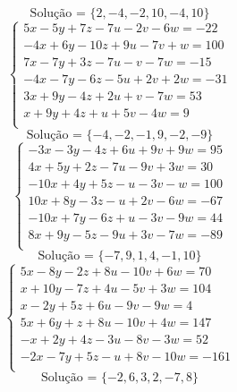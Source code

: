 \documentclass[12pt,oneside,a4paper]{article}
\begin{document}
\begin{equation*}
\text{Solução = }\{2,-4,-2,10,-4,10\}
\end{equation*}
\vspace{\baselineskip}
\begin{equation*}
\begin{cases}
5x-5y+7z-7u-2v-6w=-22 \\
-4x+6y-10z+9u-7v+w=100 \\
7x-7y+3z-7u-v-7w=-15 \\
-4x-7y-6z-5u+2v+2w=-31 \\
3x+9y-4z+2u+v-7w=53 \\
x+9y+4z+u+5v-4w=9 \\
\end{cases}
\end{equation*}
\begin{equation*}
\text{Solução = }\{-4,-2,-1,9,-2,-9\}
\end{equation*}
\vspace{\baselineskip}
\begin{equation*}
\begin{cases}
-3x-3y-4z+6u+9v+9w=95 \\
4x+5y+2z-7u-9v+3w=30 \\
-10x+4y+5z-u-3v-w=100 \\
10x+8y-3z-u+2v-6w=-67 \\
-10x+7y-6z+u-3v-9w=44 \\
8x+9y-5z-9u+3v-7w=-89 \\
\end{cases}
\end{equation*}
\begin{equation*}
\text{Solução = }\{-7,9,1,4,-1,10\}
\end{equation*}
\vspace{\baselineskip}
\begin{equation*}
\begin{cases}
5x-8y-2z+8u-10v+6w=70 \\
x+10y-7z+4u-5v+3w=104 \\
x-2y+5z+6u-9v-9w=4 \\
5x+6y+z+8u-10v+4w=147 \\
-x+2y+4z-3u-8v-3w=52 \\
-2x-7y+5z-u+8v-10w=-161 \\
\end{cases}
\end{equation*}
\begin{equation*}
\text{Solução = }\{-2,6,3,2,-7,8\}
\end{equation*}
\end{document}
